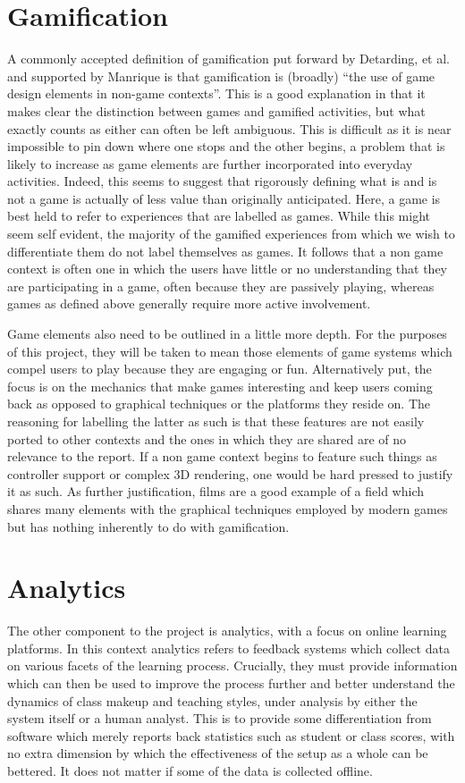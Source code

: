 \documentclass[12pt,a4paper,twoside]{report}
\begin{document}
\section{Gamification}
A commonly accepted definition of gamification put forward by Detarding, et al. \cite{deterding2011game} and supported by Manrique \cite{iversitymooc} is that gamification is (broadly) ``the use of game design elements in non-game contexts''. This is a good explanation in that it makes clear the distinction between games and gamified activities, but what exactly counts as either can often be left ambiguous. This is difficult as it is near impossible to pin down where one stops and the other begins, a problem that is likely to increase as game elements are further incorporated into everyday activities. Indeed, this seems to suggest that rigorously defining what is and is not a game is actually of less value than originally anticipated. Here, a game is best held to refer to experiences that are labelled as games. While this might seem self evident, the majority of the gamified experiences from which we wish to differentiate them do not label themselves as games. It follows that a non game context is often one in which the users have little or no understanding that they are participating in a game, often because they are passively playing, whereas games as defined above generally require more active involvement.

Game elements also need to be outlined in a little more depth. For the purposes of this project, they will be taken to mean those elements of game systems which compel users to play because they are engaging or fun. Alternatively put, the focus is on the mechanics that make games interesting and keep users coming back as opposed to graphical techniques or the platforms they reside on. The reasoning for labelling the latter as such is that these features are not easily ported to other contexts and the ones in which they are shared are of no relevance to the report. If a non game context begins to feature such things as controller support or complex 3D rendering, one would be hard pressed to justify it as such. As further justification, films are a good example of a field which shares many elements with the graphical techniques employed by modern games but has nothing inherently to do with gamification.

\section{Analytics}
The other component to the project is analytics, with a focus on online learning platforms. In this context analytics refers to feedback systems which collect data on various facets of the learning process. Crucially, they must provide information which can then be used to improve the process further and better understand the dynamics of class makeup and teaching styles, under analysis by either the system itself or a human analyst. This is to provide some differentiation from software which merely reports back statistics such as student or class scores, with no extra dimension by which the effectiveness of the setup as a whole can be bettered. It does not matter if some of the data is collected offline.
\end{document}
